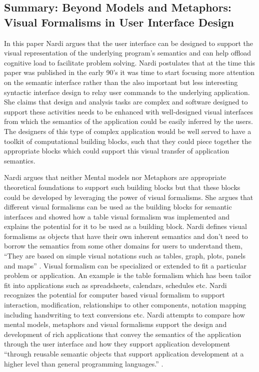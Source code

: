 \documentclass{sig-alternate}
\begin{document}
\subsection{Summary: Beyond Models and Metaphors: Visual Formalisms in User
Interface Design\cite{Nardi:BeyondModels}}
In this paper Nardi argues that the user interface can be designed to support
the visual representation of the underlying program's semantics and can help
offload cognitive load to facilitate problem solving. Nardi postulates that at
the time this paper was published in the early 90's it was time to start
focusing more attention on the semantic interface rather than the also
important but less interesting syntactic interface design to relay user
commands to the underlying application. She claims that design and analysis tasks are complex and software designed to support these activities needs to be enhanced with well-designed
visual interfaces from which the semantics of the application could be easily
inferred by the users. The designers of this type of complex application would
be well served to have a toolkit of computational building blocks, such that
they could piece together the appropriate blocks which could support this
visual transfer of application semantics.
 
 
Nardi argues that neither Mental models nor Metaphors are appropriate
theoretical foundations to support such  building blocks but that these blocks
could be developed by leveraging the power of visual formalisms. She argues that
different visual formalisms can be used as the building blocks for semantic
interfaces and showed how a table visual formalism was implemented and explains
the potential for it to be used as a building block. Nardi defines visual
formalisms as objects that have their own inherent semantics and don't need to
borrow the semantics from some other domains for users to understand them,
``They are based on simple visual notations such as tables, graph, plots, panels
and maps'' \cite{Nardi:BeyondModels}. Visual formalism can be specialized or
extended to fit a particular problem or application. An example is the table
formalism which has been tailor fit into applications such as spreadsheets,
calendars, schedules etc.  Nardi recognizes the potential for computer based
visual formalism to support interaction, modification, relationships  to other
components, notation mapping including handwriting to text conversions etc.
Nardi attempts to compare how mental models, metaphors and visual formalisms
support the design and development of rich applications that convey the
semantics of the application through the user interface and how they support
application development ``through reusable semantic objects that support
application development at a higher level than general programming languages.''
\cite{Nardi:BeyondModels}. 
 
\end{document}
